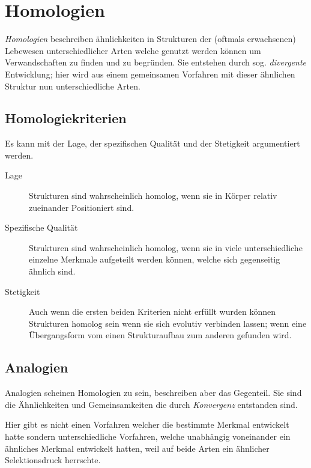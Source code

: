 \documentclass{article}
\begin{document}
\section{Homologien}
\emph{Homologien} beschreiben ähnlichkeiten in Strukturen der (oftmals erwachsenen) Lebewesen unterschiedlicher Arten welche genutzt werden können um Verwandschaften zu finden und zu begründen. Sie entstehen durch sog. \emph{divergente} Entwicklung; hier wird aus einem gemeinsamen Vorfahren mit dieser ähnlichen Struktur nun unterschiedliche Arten.
 
\subsection{Homologiekriterien} 
Es kann mit der Lage, der spezifischen Qualität und der Stetigkeit argumentiert werden.
\begin{description}
 \item[Lage] Strukturen sind wahrscheinlich homolog, wenn sie in Körper relativ zueinander Positioniert sind.
 \item[Spezifische Qualität] Strukturen sind wahrscheinlich homolog, wenn sie in viele unterschiedliche einzelne Merkmale aufgeteilt werden können, welche sich gegenseitig ähnlich sind.
 \item[Stetigkeit] Auch wenn die ersten beiden Kriterien nicht erfüllt wurden können Strukturen homolog sein wenn sie sich evolutiv verbinden lassen; wenn eine Übergangsform vom einen Strukturaufbau zum anderen gefunden wird.
\end{description} 
 
\subsection{Analogien}
Analogien scheinen Homologien zu sein, beschreiben aber das Gegenteil. Sie sind die Ähnlichkeiten und Gemeinsamkeiten die durch \emph{Konvergenz} entstanden sind.
 
Hier gibt es nicht einen Vorfahren welcher die bestimmte Merkmal entwickelt hatte sondern unterschiedliche Vorfahren, welche unabhängig voneinander ein ähnliches Merkmal entwickelt hatten, weil auf beide Arten ein ähnlicher Selektionsdruck herrschte.  
\end{document}

